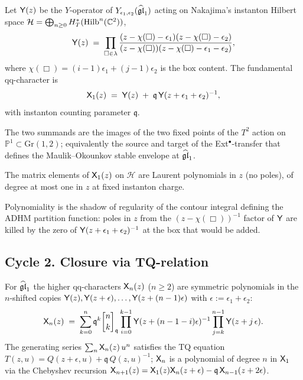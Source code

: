 \begin{definition}
Let $\mathsf{Y}(z)$ be the $Y$-operator of $Y_{\epsilon_1,\epsilon_2}(\widehat{\mathfrak{gl}}_1)$ acting on Nakajima's
instanton Hilbert space $\mathcal{H}=\bigoplus_{n\geq 0} H^*_T(\mathrm{Hilb}^n(\mathbb{C}^2))$,
\begin{equation}
\mathsf{Y}(z) \;=\; \prod_{\Box \in \lambda}
\frac{(z - \chi(\Box) - \epsilon_1)(z - \chi(\Box) - \epsilon_2)}
{(z - \chi(\Box))(z - \chi(\Box) - \epsilon_1 - \epsilon_2)},
\label{eq:Yqq-def}
\end{equation}
where $\chi(\Box)=(i-1)\epsilon_1+(j-1)\epsilon_2$ is the box content.
The fundamental qq-character is
\begin{equation}
\mathsf{X}_1(z) \;=\; \mathsf{Y}(z) \;+\; \mathfrak{q}\, \mathsf{Y}(z+\epsilon_1+\epsilon_2)^{-1},
\label{eq:X1-def}
\end{equation}
with instanton counting parameter $\mathfrak{q}$.
\end{definition}

The two summands are the images of the two fixed points of the $T^2$
action on $\mathbb{P}^1 \subset \mathrm{Gr}(1,2)$; equivalently the
source and target of the Ext$^\bullet$-transfer that defines the
Maulik--Okounkov stable envelope at $\widehat{\mathfrak{gl}}_1$.

\begin{theorem}
The matrix elements of $\mathsf{X}_1(z)$ on $\mathcal{H}$ are Laurent polynomials
in $z$ (no poles), of degree at most one in $z$ at fixed instanton
charge.
\end{theorem}

Polynomiality is the shadow of regularity of the contour integral
defining the ADHM partition function: poles in $z$ from the
$(z-\chi(\Box))^{-1}$ factor of $\mathsf{Y}$ are killed by the zero of
$\mathsf{Y}(z+\epsilon_1+\epsilon_2)^{-1}$ at the box that would be added.

\subsection{Cycle 2. Closure via TQ-relation}

\begin{theorem}
For $\widehat{\mathfrak{gl}}_1$ the higher qq-characters $\mathsf{X}_n(z)$ ($n \geq 2$) are
symmetric polynomials in the $n$-shifted copies
$\mathsf{Y}(z), \mathsf{Y}(z+\epsilon), \ldots, \mathsf{Y}(z+(n-1)\epsilon)$
with $\epsilon := \epsilon_1+\epsilon_2$:
\begin{equation}
\Xqq_n(z) \;=\; \sum_{k=0}^n \mathfrak{q}^k
\qchoose{n}{k}_{\mathfrak{q}}
\prod_{i=0}^{k-1}\Yqq(z+(n-1-i)\epsilon)^{-1}
\prod_{j=k}^{n-1}\Yqq(z+j\,\epsilon).
\label{eq:Xn-TQ}
\end{equation}
The generating series $\sum_n \mathsf{X}_n(z)\, u^n$ satisfies the TQ equation
$T(z,u) = Q(z+\epsilon,u) + \mathfrak{q}\,Q(z,u)^{-1}$; $\mathsf{X}_n$ is a
polynomial of degree $n$ in $\mathsf{X}_1$ via the Chebyshev recursion
$\mathsf{X}_{n+1}(z) = \mathsf{X}_1(z)\mathsf{X}_n(z+\epsilon) - \mathfrak{q}\,\mathsf{X}_{n-1}(z+2\epsilon)$.
\end{theorem}

